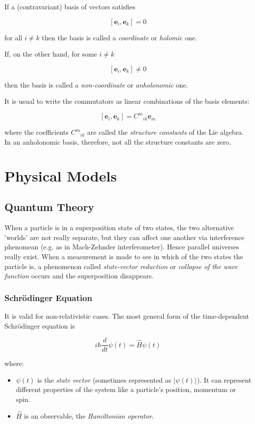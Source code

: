 \documentclass[english, 12pt]{book}
\begin{document}
If a (contravariant) basis of vectors satisfies

\[
\left[ \mathbf{e}_i, \mathbf{e}_k \right] = 0
\]

for all $i \not= k$ then the basis is called a \emph{coordinate} or \emph{holomic} one.

If, on the other hand, for some $i \not= k$

\[
\left[ \mathbf{e}_i, \mathbf{e}_k \right] \not= 0
\]

then the basis is called a \emph{non-coordinate} or \emph{anholonomic} one.

It is usual to write the commutators as linear combinations of the basis elements:

\[
\left[ \mathbf{e}_i, \mathbf{e}_k \right] = {C^m}_{ik} \mathbf{e}_m
\]

where the coefficients ${C^m}_{ik}$ are called the \emph{structure constants} of the Lie algebra. In an anholonomic basis, therefore, not all the structure constants are zero.

\part{Physical Models}

\chapter{Quantum Theory}

When a particle is in a superposition state of two states, the two alternative 'worlds' are not really separate, but they can affect one another via interference phenomean (e.g. as in Mach-Zehnder interferometer). Hence parallel universes really exist. When a measurement is made to see in which of the two states the particle is, a phenomenon called \emph{state-vector reduction} or \emph{collapse of the wave function} occurs and the superposition disappears. 

\section{Schrödinger Equation}

It is valid for non-relativistic cases. The most general form of the time-dependent Schrödinger equation is

\[
i \hbar \frac{d}{dt} \psi (t) = \hat{H} \psi (t)
\]

where:

\begin{itemize}
	\item $\psi(t)$ is the \emph{state vector} (sometimes represented as $| \psi (t) \rangle$). It can represent different properties of the system like a particle's position, momentum or spin.
	
	\item $\hat{H}$ is an observable, the \emph{Hamiltonian operator}.
\end{itemize}
\end{document}
